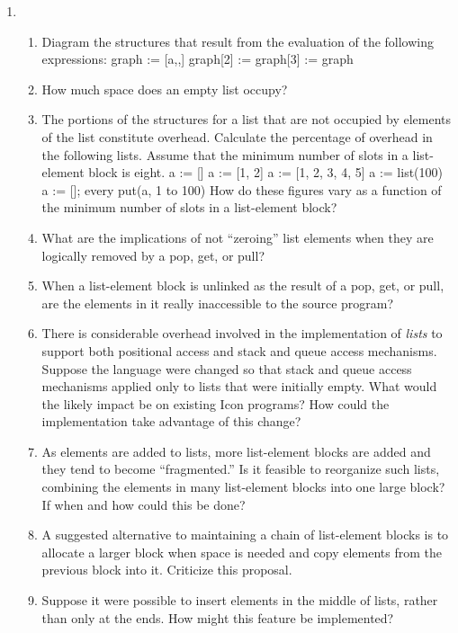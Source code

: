 \liststyleLvi
\begin{enumerate}
\item \begin{enumerate}
\item 
Diagram the structures that result from the evaluation of the
following expressions:\newline
 graph := [{\textquotedbl}a{\textquotedbl},,]\newline
 graph[2] := graph[3] := graph

\item How much space does an empty list occupy?

\item The portions of the structures for a list that are not occupied
by elements of the list constitute overhead. Calculate the percentage
of overhead in the following lists. Assume that the minimum number of
slots in a list-element block is eight.\newline
 a := []\newline
 a := [1, 2]\newline
 a := [1, 2, 3, 4, 5]\newline
 a := list(100)\newline
 a := []; every put(a, 1 to 100)\newline
How do these figures vary as a function of the minimum number of slots
in a list-element block?

\item What are the implications of not ``zeroing'' list elements when
they are logically removed by a pop, get, or pull?

\item When a list-element block is unlinked as the result of a pop,
get, or pull, are the elements in it really inaccessible to the
source program?

\item There is considerable overhead involved in the implementation of
\textit{lists }to support both positional access and stack and queue
access mechanisms. Suppose the language were changed so that stack and
queue access mechanisms applied only to lists that were initially
empty. What would the likely impact be on existing Icon programs? How
could the implementation take advantage of this change?

\item As elements are added to lists, more list-element blocks are
added and they tend to become ``fragmented.'' Is it feasible to
reorganize such lists, combining the elements in many list-element
blocks into one large block? If when and how could this be done?

\item A suggested alternative to maintaining a chain of list-element
blocks is to allocate a larger block when space is needed and copy
elements from the previous block into it. Criticize this proposal.

\item Suppose it were possible to insert elements in the middle of
lists, rather than only at the ends. How might this feature be
implemented?

\end{enumerate}
\end{enumerate}
